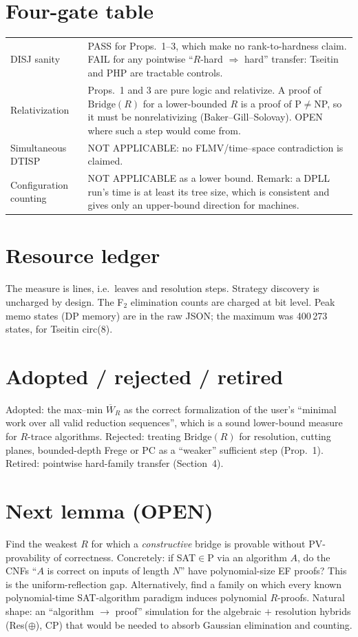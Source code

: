 \documentclass[11pt]{article}
\begin{document}
\section{Four-gate table}
\begin{tabular}{p{3.2cm}p{11cm}}\toprule
DISJ sanity & PASS for Props.~1--3, which make no rank-to-hardness claim. FAIL for any pointwise ``$R$-hard $\Rightarrow$ hard'' transfer: Tseitin and PHP are tractable controls.\\
Relativization & Props.~1 and 3 are pure logic and relativize. A proof of $\mathrm{Bridge}(R)$ for a lower-bounded $R$ is a proof of P$\neq$NP, so it must be nonrelativizing (Baker--Gill--Solovay). OPEN where such a step would come from.\\
Simultaneous DTISP & NOT APPLICABLE: no FLMV/time--space contradiction is claimed.\\
Configuration counting & NOT APPLICABLE as a lower bound. Remark: a DPLL run's time is at least its tree size, which is consistent and gives only an upper-bound direction for machines.\\
\bottomrule\end{tabular}

\section{Resource ledger}
The measure is lines, i.e.\ leaves and resolution steps. Strategy discovery is uncharged by design. The F$_2$ elimination counts are charged at bit level.
Peak memo states (DP memory) are in the raw JSON; the maximum was 400\,273 states, for Tseitin circ(8).

\section{Adopted / rejected / retired}
Adopted: the max--min $\overline W_R$ as the correct formalization of the user's ``minimal work over all valid reduction sequences'', which is a sound lower-bound measure for $R$-trace algorithms.
Rejected: treating $\mathrm{Bridge}(R)$ for resolution, cutting planes, bounded-depth Frege or PC as a ``weaker'' sufficient step (Prop.~1).
Retired: pointwise hard-family transfer (Section~4).

\section{Next lemma (OPEN)}
Find the weakest $R$ for which a \emph{constructive} bridge is provable without PV-provability of correctness.
Concretely: if SAT$\in$P via an algorithm $A$, do the CNFs ``$A$ is correct on inputs of length $N$'' have polynomial-size EF proofs?
This is the uniform-reflection gap. Alternatively, find a family on which every known polynomial-time SAT-algorithm paradigm induces polynomial $R$-proofs.
Natural shape: an ``algorithm $\to$ proof'' simulation for the algebraic $+$ resolution hybrids (Res($\oplus$), CP) that would be needed to absorb Gaussian elimination and counting.
\end{document}
